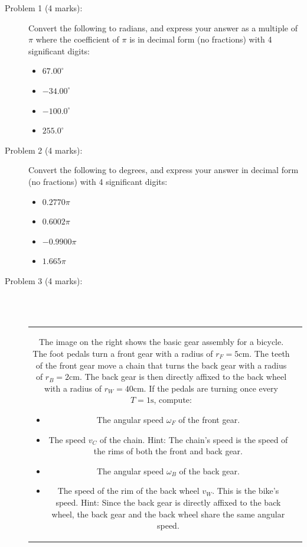 \documentclass{article}
\begin{document}
\begin{description}
\item[Problem 1 (4 marks):] Convert the following to radians, and express your answer as a multiple of \(\pi\) where the coefficient of \(\pi\) is in decimal form (no fractions) with 4 significant digits:
\begin{itemize}
\item \(67.00^\circ\)
\item \(-34.00^\circ\)
\item \(-100.0^\circ\)
\item \(255.0^\circ\)
\end{itemize} 
\item[Problem 2 (4 marks):] Convert the following to degrees, and express your answer in decimal form (no fractions) with 4 significant digits:
\begin{itemize}
\item \(0.2770\pi\)
\item \(0.6002\pi\)
\item \(-0.9900\pi\)
\item \(1.665\pi\)
\end{itemize}
\item[Problem 3 (4 marks):] ~~\\ ~~\\
\begin{tabular}{cc}
\parbox{0.4\textwidth}{
The image on the right shows the basic gear assembly for a bicycle. The foot pedals turn a front gear with a radius of \(r_F = 5\text{cm}\). The teeth of the front gear move a chain that turns the back gear with a radius of \(r_B = 2\text{cm}\). The back gear is then directly affixed to the back wheel with a radius of \(r_W = 40\text{cm}\). If the pedals are turning once every \(T = 1\text{s}\), compute:
\begin{itemize}
\item The angular speed \(\omega_F\) of the front gear.
\item The speed \(v_C\) of the chain. Hint: The chain's speed is the speed of the rims of both the front and back gear.
\item The angular speed \(\omega_B\) of the back gear.
\item The speed of the rim of the back wheel \(v_W\). This is the bike's speed. Hint: Since the back gear is directly affixed to the back wheel, the back gear and the back wheel share the same angular speed.
\end{itemize} 
} & \parbox{0.6\textwidth}{
}
\end{tabular}
\end{description}
\end{document}
